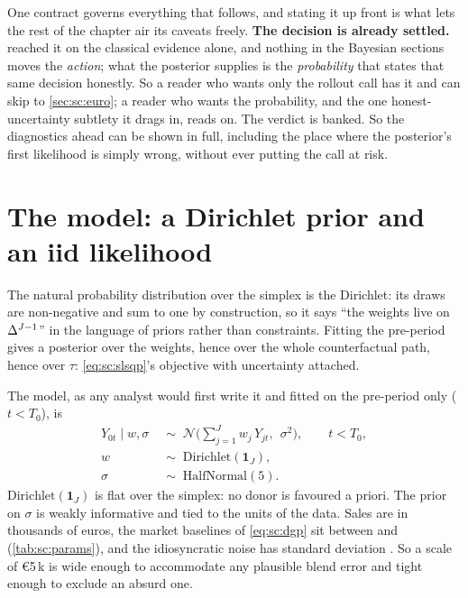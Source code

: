 One contract governs everything that follows, and stating it up front is what lets the rest of the
chapter air its caveats freely. \textbf{The decision is already settled.} 
reached it on the classical evidence alone, and nothing in the Bayesian sections moves the
\emph{action}; what the posterior supplies is the \emph{probability} that states that same decision
honestly. So a reader who wants only the rollout call has it and can skip to \cref{sec:sc:euro}; a
reader who wants the probability, and the one honest-uncertainty subtlety it drags in, reads on.
The verdict is banked. So the diagnostics ahead can be shown in full, including the place where the
posterior's first likelihood is simply wrong, without ever putting the call at risk.

\section{The model: a Dirichlet prior and an iid likelihood}
\label{sec:sc:model}

The natural probability distribution over the simplex is the Dirichlet: its draws are
non-negative and sum to one by construction, so it says ``the weights live on $\Delta^{J-1}$'' in the
language of priors rather than constraints. Fitting the pre-period gives a posterior over the
weights, hence over the whole counterfactual path, hence over $\tau$: \cref{eq:sc:slsqp}'s
objective with uncertainty attached.

The model, as any analyst would first write it and fitted on the pre-period only ($t < T_0$), is
%
\begin{align}
  Y_{0t} \mid w, \sigma &\;\sim\; \mathcal N\Big(\textstyle\sum_{j=1}^{J} w_j\, Y_{jt},\ \
                                   \sigma^{2}\Big), \qquad t < T_0, \label{eq:sc:lik}\\
  w &\;\sim\; \text{Dirichlet}(\mathbf 1_J), \label{eq:sc:prior_w}\\
  \sigma &\;\sim\; \text{HalfNormal}(5). \label{eq:sc:prior_s}
\end{align}
%
$\text{Dirichlet}(\mathbf 1_J)$ is flat over the simplex: no donor is favoured a priori. The
prior on $\sigma$ is weakly informative and tied to the units of the data. Sales are in
thousands of euros, the market baselines of \cref{eq:sc:dgp} sit between \keur{\nbSevenParLevelLo}
and \keur{\nbSevenParLevelHi} (\cref{tab:sc:params}), and the idiosyncratic noise has standard
deviation \keur{\nbSevenParNoiseSd}. So a scale of €5\,k is wide enough to accommodate
any plausible blend error and tight enough to exclude an absurd one.


